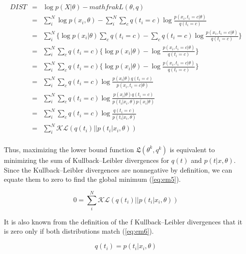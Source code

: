 \documentclass[12pt]{report}
\theoremstyle{definition}
\begin{document}
\begin{eqnarray} \label{eq:em4}
	DIST & = & \log p \left( X \vert \theta \right) - mathfrak{L} \left( \theta, q \right)  \\
	& = & \sum_i^N \log p \left( x_i,\theta \right) - \sum_i^N \sum_c q(t_i = c) \log \frac{p \left( x_i,t_i=c \vert \theta \right)}{q(t_i=c)} \\
	& = & \sum_i^N  \big\{ \log p \left( x_i \vert \theta \right) \sum_c q(t_i=c) - \sum_c q(t_i = c) \log \frac{p \left( x_i,t_i=c \vert \theta \right)}{q(t_i=c)} \big\} \\
	& = & \sum_i^N \sum_c q(t_i = c) \big\{ \log p \left( x_i \vert \theta \right) - \log \frac{p \left( x_i,t_i=c \vert \theta \right)}{q(t_i=c)} \big\} \\
	& = & \sum_i^N \sum_c q(t_i = c) \big\{ \log p \left( x_i \vert \theta \right) - \log \frac{p \left( x_i,t_i=c \vert \theta \right)}{q(t_i=c)} \big\} \\
	& = & \sum_i^N \sum_c q(t_i = c) \log  \frac{p \left( x_i \vert \theta \right) q(t_i=c)}{p \left( x_i,t_i=c \vert \theta \right)}  \\
	& = & \sum_i^N \sum_c q(t_i = c) \log  \frac{p \left( x_i \vert \theta \right) q(t_i=c)}{p \left( t_i \vert x_i,\theta \right) p \left( x_i \vert \theta \right)}  \\
	& = & \sum_i^N \sum_c q(t_i = c) \log  \frac{ q(t_i=c)}{p \left( t_i \vert x_i,\theta \right) }  \\
	& = & \sum_i^N \mathcal{KL}( q(t_i) \vert \vert p \left( t_i \vert x_i, \theta \right) )\\
\end{eqnarray}

Thus, maximizing the lower bound function $\mathfrak{L} \left( \theta^k, q^k \right)$ is equivalent to minimizing the sum of Kullback–Leibler divergences for $q( t)$ and $p \left ( t \vert x, \theta \right)$. 
Since the Kullback–Leibler divergences are nonnegative by definition, we can equate them to zero to find the global minimum (\ref{eq:em5}).

\begin{equation} \label{eq:em5}
0 = \sum_i^N \mathcal{KL} \left( q \left( t_i \right) \vert \vert p \left( t_i \vert x_i, \theta \right) \right) 
\end{equation}

It is also known from the definition of the f Kullback–Leibler divergences that it is zero only if both distributions match (\ref{eq:em6}).

\begin{equation} \label{eq:em6}
q \left( t_i \right)  =  p \left( t_i \vert x_i, \theta \right) 
\end{equation}
\end{document}
